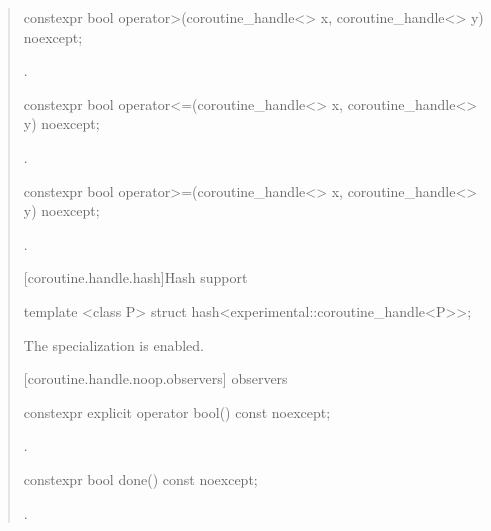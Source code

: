 \begin{quote}
\begin{itemdecl}
  constexpr bool operator>(coroutine_handle<> x, coroutine_handle<> y) noexcept;
\end{itemdecl}

\begin{itemdescr}
  \pnum
  \returns {}.
\end{itemdescr}

\begin{itemdecl}
  constexpr bool operator<=(coroutine_handle<> x, coroutine_handle<> y) noexcept;
\end{itemdecl}

\begin{itemdescr}
  \pnum
  \returns {}.
\end{itemdescr}

\begin{itemdecl}
  constexpr bool operator>=(coroutine_handle<> x, coroutine_handle<> y) noexcept;
\end{itemdecl}

\begin{itemdescr}
  \pnum
  \returns {}.
\end{itemdescr}

[coroutine.handle.hash]{Hash support}

\begin{itemdecl}
  template <class P> struct hash<experimental::coroutine_handle<P>>;
\end{itemdecl}

\begin{itemdescr}
  \pnum
The specialization is enabled.
\end{itemdescr}

[coroutine.handle.noop.observers]{ observers}
\begin{itemdecl}
  constexpr explicit operator bool() const noexcept; 
\end{itemdecl}

\begin{itemdescr}
  \pnum
  \returns {}.
\end{itemdescr}

\begin{itemdecl}
  constexpr bool done() const noexcept; 
\end{itemdecl}

\begin{itemdescr}
  \pnum
  \returns {}.
\end{itemdescr}


\end{quote}
